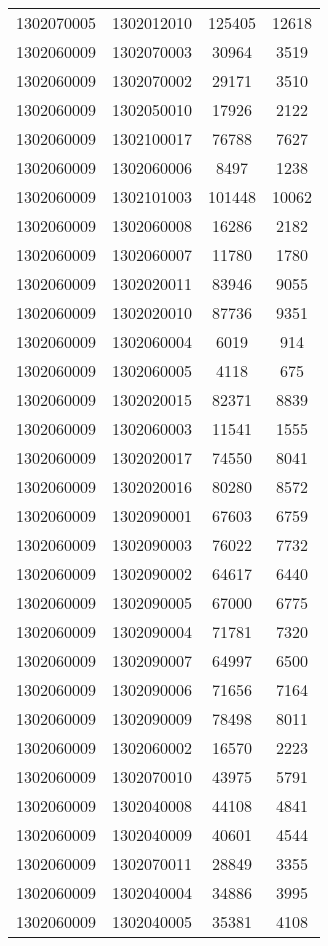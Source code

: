 \begin{longtable}[h]{llcc}
		1302070005 & 1302012010 & 125405 & 12618\\
		1302060009 & 1302070003 & 30964 & 3519\\
		1302060009 & 1302070002 & 29171 & 3510\\
		1302060009 & 1302050010 & 17926 & 2122\\
		1302060009 & 1302100017 & 76788 & 7627\\
		1302060009 & 1302060006 & 8497 & 1238\\
		1302060009 & 1302101003 & 101448 & 10062\\
		1302060009 & 1302060008 & 16286 & 2182\\
		1302060009 & 1302060007 & 11780 & 1780\\
		1302060009 & 1302020011 & 83946 & 9055\\
		1302060009 & 1302020010 & 87736 & 9351\\
		1302060009 & 1302060004 & 6019 & 914\\
		1302060009 & 1302060005 & 4118 & 675\\
		1302060009 & 1302020015 & 82371 & 8839\\
		1302060009 & 1302060003 & 11541 & 1555\\
		1302060009 & 1302020017 & 74550 & 8041\\
		1302060009 & 1302020016 & 80280 & 8572\\
		1302060009 & 1302090001 & 67603 & 6759\\
		1302060009 & 1302090003 & 76022 & 7732\\
		1302060009 & 1302090002 & 64617 & 6440\\
		1302060009 & 1302090005 & 67000 & 6775\\
		1302060009 & 1302090004 & 71781 & 7320\\
		1302060009 & 1302090007 & 64997 & 6500\\
		1302060009 & 1302090006 & 71656 & 7164\\
		1302060009 & 1302090009 & 78498 & 8011\\
		1302060009 & 1302060002 & 16570 & 2223\\
		1302060009 & 1302070010 & 43975 & 5791\\
		1302060009 & 1302040008 & 44108 & 4841\\
		1302060009 & 1302040009 & 40601 & 4544\\
		1302060009 & 1302070011 & 28849 & 3355\\
		1302060009 & 1302040004 & 34886 & 3995\\
		1302060009 & 1302040005 & 35381 & 4108\\

\end{longtable}
